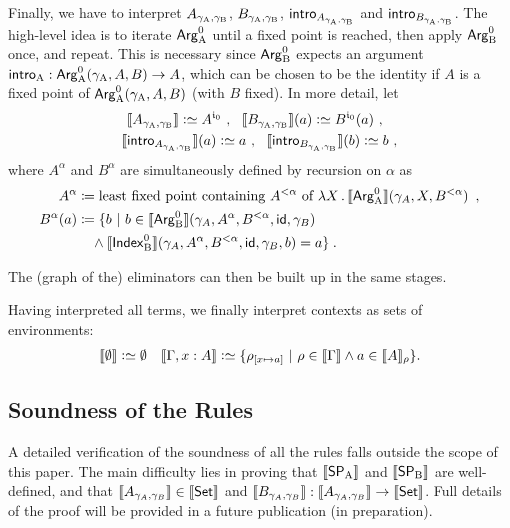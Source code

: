 \documentclass{schwicht}
\begin{document}
Finally, we have to interpret $A_{\gamma_{\mathrm{A}}, \gamma_{\mathrm{B}}}$, $B_{\gamma_{\mathrm{A}}, \gamma_{\mathrm{B}}}$,
$\mathsf{intro}_{A_{\gamma_{\mathrm{A}}, \gamma_{\mathrm{B}}}}$ and $\mathsf{intro}_{B_{\gamma_{\mathrm{A}}, \gamma_{\mathrm{B}}}}$.  The high-level
idea is to iterate $\mathsf{Arg}^{0}_{\mathrm{A}}$ until a fixed point is reached, then apply
$\mathsf{Arg}^{0}_{\mathrm{B}}$ once, and repeat. This is necessary since $\mathsf{Arg}^{0}_{\mathrm{B}}$ expects an
argument $\mathsf{intro}_{\mathrm{A}} : \mathsf{Arg}^{0}_{\mathrm{A}}(\gamma_{\mathrm{A}}, A, B) \to A$, which can be chosen
to be the identity if $A$ is a fixed point of $\mathsf{Arg}^{0}_{\mathrm{A}}(\gamma_{\mathrm{A}}, A, B)$
(with $B$ fixed). In more detail, let
\begin{gather*}
\sem{A_{\gammaAB}} \colonsimeq A^{\cardz} \enspace\! , \quad\!\!
\sem{B_{\gammaAB}}(a) \colonsimeq B^{\cardz}(a)\enspace\! , \quad\!\! \\
\sem{\intro{A_{\gammaAB}}}(a) \colonsimeq a \enspace\! ,\quad\!\!
\sem{\intro{B_{\gammaAB}}}(b) \colonsimeq b \enspace\! ,
\end{gather*}  \noindent 
where $A^{\alpha}$ and $B^{\alpha}$ are
simultaneously defined by recursion on $\alpha$ as
\begin{align*}
  A^{\alpha} & \coloneqq  \text{least fixed point containing $A^{< \alpha}$ of }
       \lambda X\,.\, \llbracket \mathsf{Arg}^{0}_{\mathrm{A}} \rrbracket(\gamma_A, X, B^{< \alpha}) \enspace ,\\
  B^{\alpha}(a) & \coloneqq \{b\ |\ b \in \llbracket \mathsf{Arg}^{0}_{\mathrm{B}} \rrbracket(\gamma_A, A^{\alpha},
  B^{< \alpha}, \mathsf{id}, \gamma_B) \\
  & \quad \land \llbracket \mathsf{Index}^{0}_{\mathrm{B}} \rrbracket(\gamma_A,
  A^{\alpha}, B^{< \alpha}, \mathsf{id}, \gamma_B, b) = a \}\enspace \hspace{-2.47968pt} .
\end{align*}

The (graph of the) eliminators can then be built up in the same
stages.

Having interpreted all terms, we finally interpret contexts as sets of environments:
\begin{align*}
  \llbracket \emptyset \rrbracket \mathrel{\mathop:}\simeq \emptyset && \llbracket \Gamma, x : A \rrbracket \mathrel{\mathop:}\simeq \{
  \rho_{[x \mapsto a]} \ |\ \rho \in \llbracket \Gamma \rrbracket \land a \in \llbracket A \rrbracket_\rho\}.
\end{align*}

\subsection{Soundness of the Rules}

A detailed verification of the soundness of all the rules falls
outside the scope of this paper. The main difficulty lies in proving
that $\llbracket \mathsf{SP}_{\mathrm{A}} \rrbracket$ and $\llbracket \mathsf{SP}_{\mathrm{B}} \rrbracket$ are well-defined, and that
$\llbracket A_{\gamma_A, \gamma_B} \rrbracket \in \llbracket \mathsf{Set} \rrbracket$ and $\llbracket B_{\gamma_A,
    \gamma_B} \rrbracket : \llbracket A_{\gamma_A, \gamma_B} \rrbracket \to \llbracket \mathsf{Set} \rrbracket$. Full
details of the proof will be provided in a future publication (in
preparation).
\end{document}
